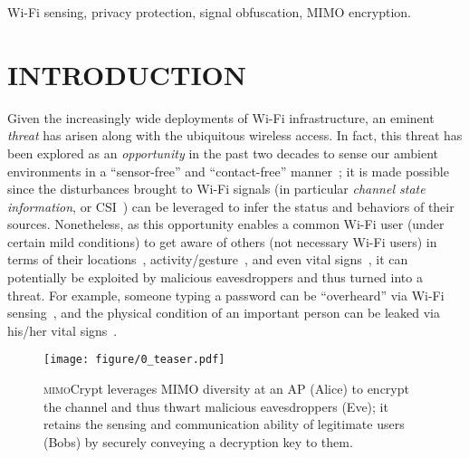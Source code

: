 \documentclass[conference,compsoc]{IEEEtran}
\newcommand{\sname}{\textsc{mimo}Crypt\xspace}
\newcommand{\newrev}[1]{{\color{blue}#1}}    %
\newcommand{\newrev}[1]{#1}
\begin{document}

%
\begin{IEEEkeywords}Wi-Fi sensing, privacy protection, signal obfuscation, \newrev{MIMO encryption}.
\end{IEEEkeywords}
\maketitle


\section{\MakeUppercase{Introduction}} \label{sec:intro}
%
Given the increasingly wide deployments of Wi-Fi infrastructure, an eminent \textit{threat} has arisen along with the ubiquitous wireless access. In fact, this threat has been explored as an \textit{opportunity} in the past two decades to sense our ambient environments in a ``sensor-free'' and ``contact-free'' manner~\cite{CThru-SIGCOMM13,WiHear-MobiCom14,iLocScan,WiDeo-NSDI15,VitalSign-MobiHoc15,WiKey-MobiCom15,LiFS-MobiCom16,SSNR-UbiComp22}; it is made possible since the disturbances brought to Wi-Fi signals (in particular \textit{channel state information}, or CSI~\cite{CSI-CCR11}) can be leveraged to infer the status and behaviors of their sources. Nonetheless, as this opportunity enables a common Wi-Fi user (under certain mild conditions) to get aware of others (not necessary Wi-Fi users) in terms of their locations~\cite{iLocScan,WiDeo-NSDI15,LiFS-MobiCom16}, activity/gesture~\cite{CThru-SIGCOMM13,WiHear-MobiCom14,WiKey-MobiCom15,Widar3-MobiSys19}, and even vital signs~\cite{VitalSign-MobiHoc15,SSNR-UbiComp22,zhang2022can}, it can potentially be exploited by malicious eavesdroppers and thus turned into a threat. For example, \newrev{someone typing a password can be ``overheard'' via Wi-Fi sensing~\cite{WiKey-MobiCom15, fang2018no, yang2022wink, WiKI-Eve-CCS23},} and the physical condition of an important person can be leaked via his/her vital signs~\cite{SSNR-UbiComp22,zhang2022can}. 
%
\begin{figure}[t]
    \setlength\abovecaptionskip{8pt}
	\centering
	\texttt{[image: figure/0\_teaser.pdf]}
	\caption{\sname leverages MIMO diversity at an AP (Alice) to encrypt the channel and thus thwart malicious eavesdroppers (Eve); it retains the sensing and communication ability of legitimate users (Bobs) by securely conveying a \newrev{decryption} key to them.} 
	\label{fig:teaser}
	\vspace{-1ex}
\end{figure}
\end{document}
